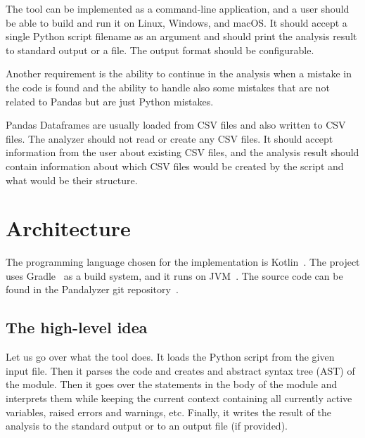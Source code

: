 The tool can be implemented as a command-line application, and a user should be able to build and run it on Linux,
Windows, and macOS\@.
It should accept a single Python script filename as an argument and should print the analysis result to standard output
or a file.
The output format should be configurable.

Another requirement is the ability to continue in the analysis when a mistake in the code is found and the ability
to handle also some mistakes that are not related to Pandas but are just Python mistakes.

Pandas Dataframes are usually loaded from CSV files and also written to CSV files.
The analyzer should not read or create any CSV files.
It should accept information from the user about existing CSV files, and the analysis result should contain
information about which CSV files would be created by the script and what would be their structure.

\section{Architecture}

The programming language chosen for the implementation is Kotlin~\cite{kotlinDocs}.
The project uses Gradle~\cite{gradleDocs} as a build system, and it runs on JVM~\cite{jvmSpec}\@.
The source code can be found in the Pandalyzer git repository~\cite{pandalyzer}.

\subsection{The high-level idea}

Let us go over what the tool does.
It loads the Python script from the given input file.
Then it parses the code and creates and abstract syntax tree (AST) of the module.
Then it goes over the statements in the body of the module and interprets them while keeping the current context
containing all currently active variables, raised errors and warnings, etc.
Finally, it writes the result of the analysis to the standard output or to an output file (if provided).

